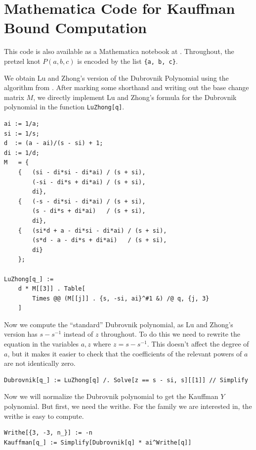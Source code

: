 \chapter{Mathematica Code for Kauffman Bound Computation}\label{ch:appendix}

\lstset{language=Mathematica,style=better}

This code is also available as a Mathematica notebook at \cite{my-code}.
Throughout, the pretzel knot $P(a, b, c)$ is encoded by the list \lstinline|{a, b, c}|.

We obtain Lu and Zhong's version of the Dubrovnik Polynomial using the algorithm from \cite{lu-zhong}.
After marking some shorthand and writing out the base change matrix $M$, we directly implement Lu and Zhong's formula for the Dubrovnik polynomial in the function \lstinline|LuZhong[q]|.

\begin{lstlisting}
ai := 1/a;
si := 1/s;
d  := (a - ai)/(s - si) + 1;
di := 1/d;
M   = {
    {   (si - di*si - di*ai) / (s + si),
        (-si - di*s + di*ai) / (s + si),
        di},
    {   (-s - di*si - di*ai) / (s + si),
        (s - di*s + di*ai)   / (s + si),
        di},
    {   (si*d + a - di*si - di*ai) / (s + si),
        (s*d - a - di*s + di*ai)   / (s + si),
        di}
    };

LuZhong[q_] :=
    d * M[[3]] . Table[
        Times @@ (M[[j]] . {s, -si, ai}^#1 &) /@ q, {j, 3}
    ]
\end{lstlisting}

Now we compute the ``standard'' Dubrovnik polynomial, as Lu and Zhong's version has $s - s^{-1}$ instead of $z$ throughout. To do this we need to rewrite the equation in the variables $a, z$ where $z = s - s^{-1}$. This doesn't affect the degree of $a$, but it makes it easier to check that the coefficients of the relevant powers of $a$ are not identically zero.

\begin{lstlisting}
Dubrovnik[q_] := LuZhong[q] /. Solve[z == s - si, s][[1]] // Simplify
\end{lstlisting}

Now we will normalize the Dubrovnik polynomial to get the Kauffman $Y$ polynomial. But first, we need the writhe. For the family we are interested in, the writhe is easy to compute.

\begin{lstlisting}
Writhe[{3, -3, n_}] := -n
Kauffman[q_] := Simplify[Dubrovnik[q] * ai^Writhe[q]]
\end{lstlisting}

